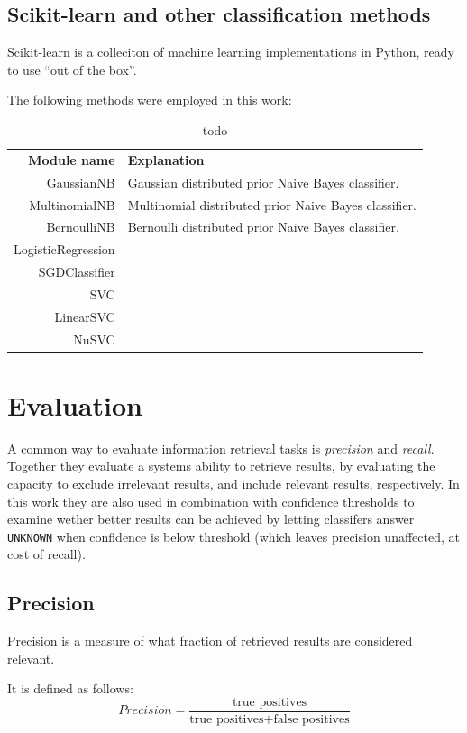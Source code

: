 \documentclass[a4paper,11pt]{kth-mag}
\begin{document}
\subsection{Scikit-learn and other classification methods}
Scikit-learn\cite{scikit-learn} is a colleciton of machine learning implementations in Python, ready to use ``out of the box''.

The following methods were employed in this work:

\begin{table}[h]
  \centering
  \begin{tabular}{ r l }
    \textbf{Module name} & \textbf{Explanation}\\
    GaussianNB & Gaussian distributed prior Naive Bayes classifier.\\
    MultinomialNB & Multinomial distributed prior Naive Bayes classifier.\\
    BernoulliNB & Bernoulli distributed prior Naive Bayes classifier.\\
    LogisticRegression & \\
    SGDClassifier & \\
    SVC & \\
    LinearSVC & \\
    NuSVC & \\
  \end{tabular}
  \caption{todo}
  \label{todo}
\end{table}

\section{Evaluation}
A common way to evaluate information retrieval tasks is \emph{precision} and \emph{recall}. Together they evaluate a systems ability to retrieve results, by evaluating the capacity to exclude irrelevant results, and include relevant results, respectively. In this work they are also used in combination with confidence thresholds to examine wether better results can be achieved by letting classifers answer \texttt{UNKNOWN} when confidence is below threshold (which leaves precision unaffected, at cost of recall).

\subsection{Precision}
Precision is a measure of what fraction of retrieved results are considered relevant.

It is defined as follows:
\begin{equation} \label{eq:precision}
Precision = \frac{\text {true positives}}{\text{true positives} + \text{false positives}}
\end{equation}
\end{document}
